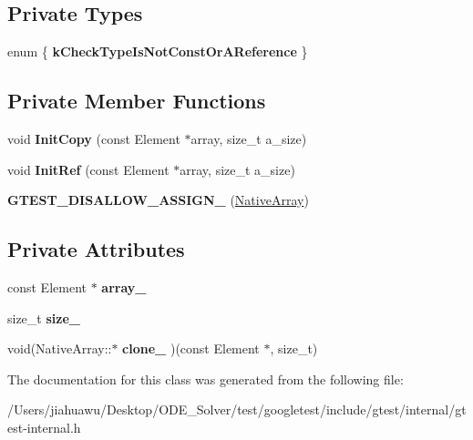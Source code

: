 \subsection*{Private Types}
\begin{DoxyCompactItemize}
\item 
\mbox{\label{classtesting_1_1internal_1_1_native_array_abe36a7e1b487dc6b9bd81489b1c2af28}} 
enum \{ {\bfseries k\+Check\+Type\+Is\+Not\+Const\+Or\+A\+Reference}
 \}
\end{DoxyCompactItemize}
\subsection*{Private Member Functions}
\begin{DoxyCompactItemize}
\item 
\mbox{\label{classtesting_1_1internal_1_1_native_array_a8c0069cc09f559785fe4923fc118056f}} 
void {\bfseries Init\+Copy} (const Element $\ast$array, size\+\_\+t a\+\_\+size)
\item 
\mbox{\label{classtesting_1_1internal_1_1_native_array_ac6ad6d79e17e2c98a9d4d684afcb7f79}} 
void {\bfseries Init\+Ref} (const Element $\ast$array, size\+\_\+t a\+\_\+size)
\item 
\mbox{\label{classtesting_1_1internal_1_1_native_array_a6633f3eab6947d4502fb1c69f95be66e}} 
{\bfseries G\+T\+E\+S\+T\+\_\+\+D\+I\+S\+A\+L\+L\+O\+W\+\_\+\+A\+S\+S\+I\+G\+N\+\_\+} (\mbox{\hyperlink{classtesting_1_1internal_1_1_native_array}{Native\+Array}})
\end{DoxyCompactItemize}
\subsection*{Private Attributes}
\begin{DoxyCompactItemize}
\item 
\mbox{\label{classtesting_1_1internal_1_1_native_array_adadc025fbbbd43904d4036991019f18f}} 
const Element $\ast$ {\bfseries array\+\_\+}
\item 
\mbox{\label{classtesting_1_1internal_1_1_native_array_aa7e4251de39aaa75f697f0eaeedbf06e}} 
size\+\_\+t {\bfseries size\+\_\+}
\item 
\mbox{\label{classtesting_1_1internal_1_1_native_array_addd7442a10398a60215a9989bcbd8078}} 
void(Native\+Array\+::$\ast$ {\bfseries clone\+\_\+} )(const Element $\ast$, size\+\_\+t)
\end{DoxyCompactItemize}


The documentation for this class was generated from the following file\+:\begin{DoxyCompactItemize}
\item 
/\+Users/jiahuawu/\+Desktop/\+O\+D\+E\+\_\+\+Solver/test/googletest/include/gtest/internal/gtest-\/internal.\+h\end{DoxyCompactItemize}
